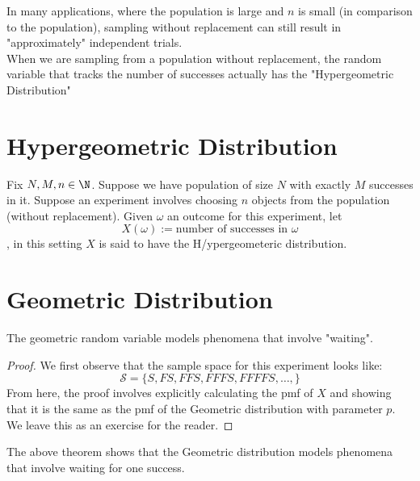 In many applications, where the population is large and $n$ is small (in comparison to the population), sampling without replacement can still result in "approximately" independent trials.
\\

When we are sampling from a population without replacement, the random variable that tracks the number of successes actually has the "Hypergeometric Distribution"

\section{Hypergeometric Distribution}
Fix $N,M,n\in \N$. Suppose we have population of size $N$ with exactly $M$ successes in it. Suppose an experiment involves choosing $n$ objects from the population (without replacement). Given $\omega$ an outcome for this experiment, let
$$X(\omega) := \text{number of successes in $\omega$}$$, in this setting $X$ is said to have the H/ypergeometeric distribution.






\section{Geometric Distribution}
The geometric random variable models phenomena that involve "waiting". 





\begin{proof}
We first observe that the sample space for this experiment looks like:
$$ \mathcal{S} = \{S, FS, FFS, FFFS, FFFFS, \dots, \}$$
From here, the proof involves explicitly calculating the pmf of $X$ and showing that it is the same as the pmf of the Geometric distribution with parameter $p$. We leave this as an exercise for the reader. 
\end{proof}
The above theorem shows that the Geometric distribution models phenomena that involve waiting for one success. 


